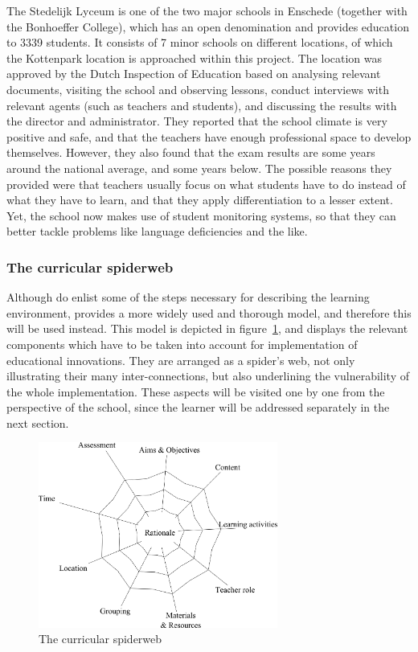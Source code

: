 The Stedelijk Lyceum is one of the two major schools in Enschede (together with the Bonhoeffer College), which has an open denomination and provides education to 3339 students. It consists of 7 minor schools on different locations, of which the Kottenpark location is approached within this project. The location was approved by the Dutch Inspection of Education \cite{inspectierapport} based on analysing relevant documents, visiting the school and observing lessons, conduct interviews with relevant agents (such as teachers and students), and discussing the results with the director and administrator. They reported that the school climate is very positive and safe, and that the teachers have enough professional space to develop themselves. However, they also found that the exam results are some years around the national average, and some years below. The possible reasons they provided were that teachers usually focus on what students have to do instead of what they have to learn, and that they apply differentiation to a lesser extent. Yet, the school now makes use of student monitoring systems, so that they can better tackle problems like language deficiencies and the like.

\subsubsection{The curricular spiderweb}

Although  do enlist some of the steps necessary for describing the learning environment,  provides a more widely used and thorough model, and therefore this will be used instead. This model is depicted in figure~\ref{fig:spiderweb}, and displays the relevant components which have to be taken into account for implementation of educational innovations. They are arranged as a spider's web, not only illustrating their many inter-connections, but also underlining the vulnerability of the whole implementation. These aspects will be visited one by one from the perspective of the school, since the learner will be addressed separately in the next section.

\begin{figure}
    \centering
    \includegraphics[width=0.7\textwidth]{img/curricular_spiderweb.png}
    \caption{The curricular spiderweb \protect\cite{curricularspiderweb}}
    \label{fig:spiderweb}
\end{figure}

